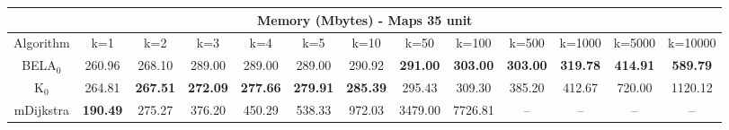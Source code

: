 \begin{tabular}{c|cccccccccccc}\toprule
\multicolumn{13}{c}{Memory (Mbytes) - Maps 35 unit}\\ \midrule
Algorithm & k=1 & k=2 & k=3 & k=4 & k=5 & k=10 & k=50 & k=100 & k=500 & k=1000 & k=5000 & k=10000 \\ \midrule
BELA$_0$ & 260.96 & 268.10 & 289.00 & 289.00 & 289.00 & 290.92 & \textbf{291.00} & \textbf{303.00} & \textbf{303.00} & \textbf{319.78} & \textbf{414.91} & \textbf{589.79} \\
K$_0$ & 264.81 & \textbf{267.51} & \textbf{272.09} & \textbf{277.66} & \textbf{279.91} & \textbf{285.39} & 295.43 & 309.30 & 385.20 & 412.67 & 720.00 & 1120.12 \\
mDijkstra & \textbf{190.49} & 275.27 & 376.20 & 450.29 & 538.33 & 972.03 & 3479.00 & 7726.81 & -- & -- & -- & -- \\ \bottomrule 
\end{tabular}
